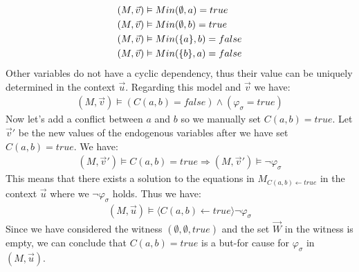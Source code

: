 \documentclass{article}
\begin{document}
\begin{example}
\begin{align*}
        (M,\vec v) & \vDash Min(\emptyset,a) = true     \\
        (M,\vec v) & \vDash Min(\emptyset,b) = true     \\
        (M,\vec v) & \vDash Min(\{a\},b) = false \\
        (M,\vec v) & \vDash Min(\{b\},a) = false \\
    \end{align*}
    Other variables do not have a cyclic dependency, thus their value
    can be uniquely determined in the context $\vec u$.
    Regarding this model and $\vec v$ we have:
    \begin{align*}
        (M,\vec v) \vDash (C(a,b) = false) \wedge \left(\varphi_{\sigma} = true\right)
    \end{align*}
    Now let's add a conflict between $a$ and $b$ so we manually set
    $C(a,b) = true$.
    Let $\vec v'$ be the new values of the endogenous variables
    after we have set $C(a,b) = true$.
    We have:
    \begin{align*}
        (M, \vec v') \vDash C(a,b) = true
        \Rightarrow  (M, \vec v') \vDash \neg \varphi_{\sigma}
    \end{align*}
    This means that there exists a solution to the equations in
    $M_{C(a,b) \leftarrow true}$ in the context $\vec u$ where we $\neg \varphi_{\sigma}$ holds.
    Thus we have:
    \begin{align*}
        (M, \vec u) \vDash \langle C(a,b) \leftarrow true \rangle \neg \varphi_{\sigma}
    \end{align*}
    Since we have considered the witness $(\emptyset, \emptyset, true)$
    and the set $\vec W$ in the witness is empty, we can conclude
    that $C(a,b) = true$ is a but-for cause for $\varphi_{\sigma}$
    in $(M,\vec u)$.
\end{example}
\end{document}
